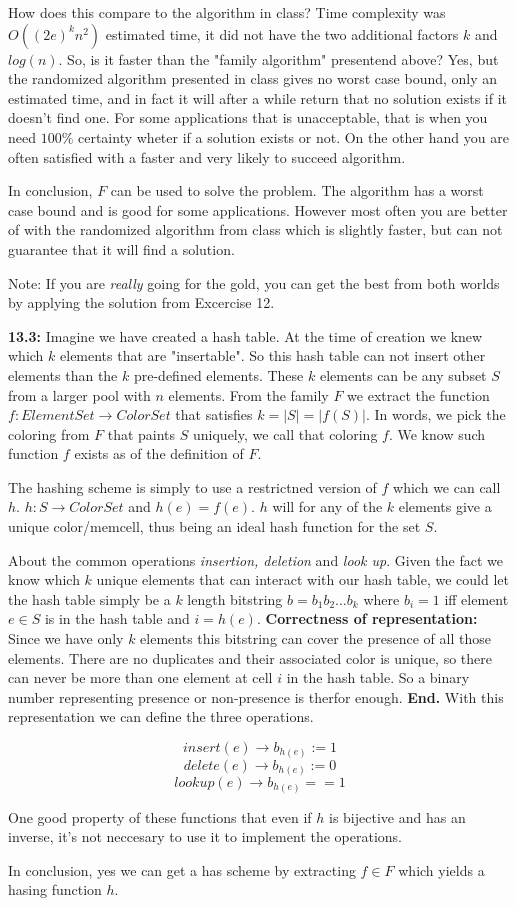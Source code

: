 \documentclass[a4paper,11pt]{article}
\begin{document}
How does this compare to the algorithm in class?
Time complexity was $O((2e)^kn^2)$ estimated time,
it did not have the two additional factors $k$ and $log(n)$.
So, is it faster than the "family algorithm" presentend above?
Yes, but the randomized algorithm presented in class gives no
worst case bound, only an estimated time, and in fact it will
after a while return that no solution exists if it doesn't find
one. For some applications that is unacceptable, that is when
you need $100\%$ certainty wheter if a solution exists or not.
On the other hand you are often satisfied with a faster and
very likely to succeed algorithm.

In conclusion, $F$ can be used to solve the problem.
The algorithm has a worst case bound and is good for some
applications. However most often you are better of with
the randomized algorithm from class which is slightly faster,
but can not guarantee that it will find a solution.

Note: If you are \emph{really} going for the gold, you
can get the best from both worlds by applying the solution
from Excercise 12.

\textbf{13.3:} Imagine we have created a hash table.
At the time of creation we knew which $k$ elements
that are "insertable". So this hash table can not insert
other elements than the $k$ pre-defined elements.
These $k$ elements can be any subset $S$ from a larger pool
with $n$ elements. From the family $F$ we extract the function
$f : ElementSet \to ColorSet$ that satisfies $k=|S|=|f(S)|$.
In words, we pick the coloring
from $F$ that paints $S$ uniquely, we call that coloring $f$.
We know such function $f$ exists as of the definition of $F$.

The hashing scheme is simply to use a restrictned
version of $f$ which we can call $h$. $h : S \to ColorSet$
and $h(e) = f(e)$. $h$ will for any of the $k$ elements
give a unique color/memcell, thus being an ideal hash
function for the set $S$.

About the common operations \emph{insertion, deletion}
and \emph{look up}. Given the fact we know which $k$ unique elements
that can interact with our hash table,
we could let the hash table simply
be a $k$ length bitstring $b = b_1 b_2 \dots b_k$ where
$b_i = 1$ iff element $e \in S$ is in the hash table
and $i = h(e)$.
\textbf{Correctness of representation:}  Since we have only $k$ elements
this bitstring can cover the presence of all those elements.
There are no duplicates and their associated color is unique,
so there can never be more than
one element at cell $i$ in the hash table. So
a binary number representing presence or non-presence
is therfor enough.
 \textbf{End.}
With this representation we can define the three operations.

\[
insert(e) \to b_{h(e)} := 1
\]
\[
delete(e) \to b_{h(e)} := 0
\]
\[
lookup(e) \to b_{h(e)} == 1
\]

One good property of these functions that even if $h$
is bijective and has an inverse, it's not neccesary
to use it to implement the operations.


In conclusion, yes we can get a has scheme by extracting
$f \in F$ which yields a hasing function $h$.
\end{document}
